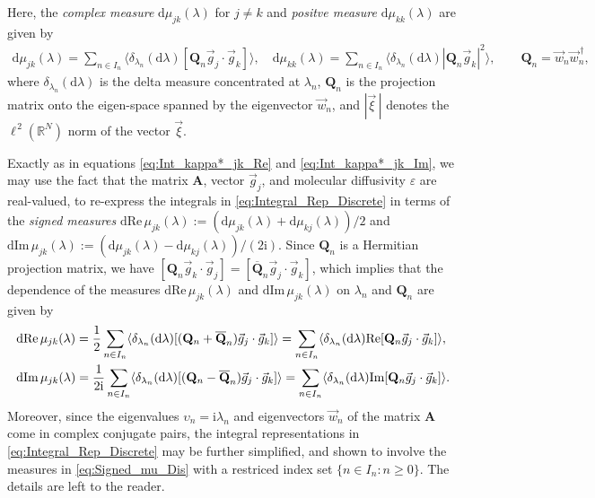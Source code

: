 \documentclass[11pt]{amsart}
\newcommand{\I}{\mathrm{i}}
\renewcommand{\d}{\mathrm{d}}
\newcommand{\Ab}{\mathbf{A}}
\newcommand{\Qb}{\mathbf{Q}}
\begin{document}
%
Here, the \emph{complex measure} $\d\mu_{jk}(\lambda)$ for $j\neq k$ and
\emph{positve measure} $\d\mu_{kk}(\lambda)$ are given by 
% 
\begin{align}
  \d\mu_{jk}(\lambda)=\sum_{n\in I_n}\langle\delta_{\lambda_n}(\d\lambda)[\Qb_n\vec{g}_j\cdot\vec{g}_k]\rangle, \quad  
  \d\mu_{kk}(\lambda)=\sum_{n\in I_n}\langle\delta_{\lambda_n}(\d\lambda)|\Qb_n\vec{g}_k|^2\rangle, \qquad
  \Qb_n=\vec{w}_n\vec{w}_n^{\,\dagger}, 
\end{align}
%
where $\delta_{\lambda_n}(\d\lambda)$ is the delta measure concentrated at $\lambda_n$,
$\Qb_n$ is the projection matrix onto the eigen-space spanned by the
eigenvector $\vec{w}_n$, and
$|\vec{\xi}\,|$ denotes the $\ell^{\,2}(\mathbb{R}^N)$ norm of the vector
$\vec{\xi}$.   




Exactly as in equations \eqref{eq:Int_kappa*_jk_Re} and
\eqref{eq:Int_kappa*_jk_Im}, we may use the fact that the matrix
$\Ab$, vector $\vec{g}_j$, and molecular diffusivity $\varepsilon$ are
real-valued, to re-express the integrals in
\eqref{eq:Integral_Rep_Discrete} in terms of the \emph{signed
  measures} 
$\d\text{Re}\,\mu_{jk}(\lambda):=(\d\mu_{jk}(\lambda)+\d\mu_{kj}(\lambda))/2$ and
$\d\text{Im}\,\mu_{jk}(\lambda):=(\d\mu_{jk}(\lambda)-\d\mu_{kj}(\lambda))/(2\I)$. Since
$\Qb_n$ is a Hermitian projection matrix, we have
$[\Qb_n\vec{g}_k\cdot\vec{g}_j]=[\overline{\Qb}_n\vec{g}_j\cdot\vec{g}_k]$,
which implies that the dependence of the measures
$\d\text{Re}\,\mu_{jk}(\lambda)$ and $\d\text{Im}\,\mu_{jk}(\lambda)$ on $\lambda_n$ and
$\Qb_n$ are given by  
%
\begin{align}\label{eq:Signed_mu_Dis}
  &\d\text{Re}\,\mu_{jk}(\lambda)      
      =\frac{1}{2}\sum_{n\in I_n}\langle\delta_{\lambda_n}(\d\lambda)[(\Qb_n+\overline{\Qb}_n)\vec{g}_j\cdot\vec{g}_k]\rangle
      =\sum_{n\in I_n}\langle\delta_{\lambda_n}(\d\lambda)\text{Re}[\Qb_n\vec{g}_j\cdot\vec{g}_k]\rangle,
      \\
  &\d\text{Im}\,\mu_{jk}(\lambda)
      =\frac{1}{2\I}\sum_{n\in I_n}\langle\delta_{\lambda_n}(\d\lambda)[(\Qb_n-\overline{\Qb}_n)\vec{g}_j\cdot\vec{g}_k]\rangle
      =\sum_{n\in I_n}\langle\delta_{\lambda_n}(\d\lambda)\text{Im}[\Qb_n\vec{g}_j\cdot\vec{g}_k]\rangle.
      \notag
\end{align}
%
Moreover, since the eigenvalues $\upsilon_n=\I\lambda_n$ and eigenvectors
$\vec{w}_n$ of the matrix $\Ab$ come in complex conjugate pairs, the
integral representations in \eqref{eq:Integral_Rep_Discrete} may be
further simplified, and shown to involve the measures in
\eqref{eq:Signed_mu_Dis} with a restriced index set $\{n\in I_n:n\geq0\}$. The
details are left to the reader.    
\end{document}
